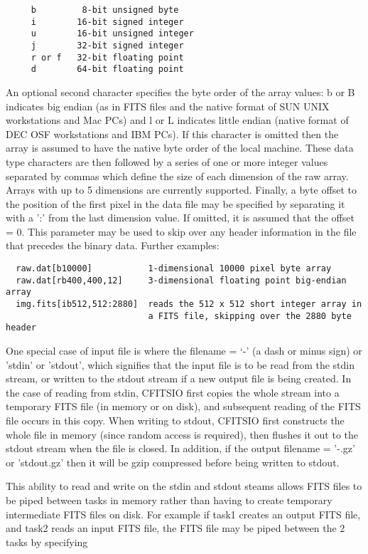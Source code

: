 \documentclass[11pt]{book}
\begin{document}
\begin{verbatim}
     b         8-bit unsigned byte
     i        16-bit signed integer
     u        16-bit unsigned integer
     j        32-bit signed integer
     r or f   32-bit floating point
     d        64-bit floating point
\end{verbatim}
An optional second character specifies the byte order of the array
values: b or B indicates big endian (as in FITS files and the native
format of SUN UNIX workstations and Mac PCs) and l or L indicates
little endian (native format of DEC OSF workstations and IBM PCs).  If
this character is omitted then the array is assumed to have the native
byte order of the local machine.  These data type characters are then
followed by a series of one or more integer values separated by commas
which define the size of each dimension of the raw array.  Arrays with
up to 5 dimensions are currently supported.  Finally, a byte offset to
the position of the first pixel in the data file may be specified by
separating it with a ':' from the last dimension value.  If omitted, it
is assumed that the offset = 0.  This parameter may be used to skip
over any header information in the file that precedes the binary data.
Further examples:

\begin{verbatim}
  raw.dat[b10000]           1-dimensional 10000 pixel byte array
  raw.dat[rb400,400,12]     3-dimensional floating point big-endian array
  img.fits[ib512,512:2880]  reads the 512 x 512 short integer array in
                            a FITS file, skipping over the 2880 byte header
\end{verbatim}

One special case of input file is where the filename = `-' (a dash or
minus sign) or 'stdin' or 'stdout', which signifies that the input file
is to be read from the stdin stream, or written to the stdout stream if
a new output file is being created.  In the case of reading from stdin,
CFITSIO first copies the whole stream into a temporary FITS file (in
memory or on disk), and subsequent reading of the FITS file occurs in
this copy.  When writing to stdout, CFITSIO first constructs the whole
file in memory (since random access is required), then flushes it out
to the stdout stream when the file is closed.  In addition, if the
output filename = '-.gz' or 'stdout.gz' then it will be gzip compressed
before being written to stdout.

This ability to read and write on the stdin and stdout steams allows
FITS files to be piped between tasks in memory rather than having to
create temporary intermediate FITS files on disk.  For example if task1
creates an output FITS file, and task2 reads an input FITS file, the
FITS file may be piped between the 2 tasks by specifying
\end{document}
